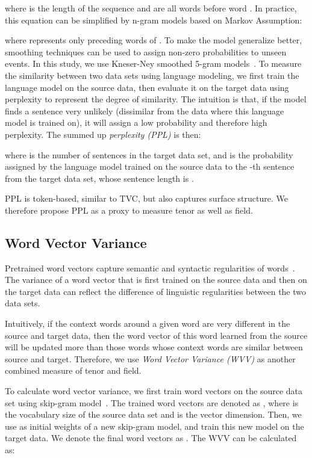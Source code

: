 \documentclass[11pt,a4paper]{article}
\begin{document}
where  is the length of the sequence and  are all words before word .
In practice, this equation can be simplified by n-gram models based on Markov Assumption:

where  represents only  preceding words of .
To make the model generalize better, smoothing techniques can be used to assign non-zero probabilities to unseen events. 
In this study, we use Kneser-Ney smoothed 5-gram models~\citep{Heafield:SMT:2011}. 
To measure the similarity between two data sets using language modeling, we first train the language model on the source data, then evaluate it on the target data using perplexity to represent the degree of similarity. 
The intuition is that, if the model finds a sentence very unlikely (dissimilar from the data where this language model is trained on), it will assign a low probability and therefore high perplexity. 
The summed up \emph{perplexity (PPL)} is then:

where  is the number of sentences in the target data set, and  is the probability assigned by the language model trained on the source data to the -th sentence from the target data set, whose sentence length is .

PPL is token-based, similar to TVC, but also captures surface structure. 
We therefore propose PPL as a proxy to measure tenor as well as field.

\subsection{Word Vector Variance}
Pretrained word vectors capture semantic and syntactic regularities of words~\citep{Artetxe:Labaka:CONLL:2018}. 
The variance of a word vector that is first trained on the source data and then on the target data can reflect the difference of linguistic regularities between the two data sets. 

Intuitively, if the context words around a given word are very different in the source and target data, then the word vector of this word learned from the source will be updated more than those words whose context words are similar between source and target. 
Therefore, we use \emph{Word Vector Variance (WVV)} as another combined measure of tenor and field.
 
To calculate word vector variance, we first train word vectors on the source data set using skip-gram model~\citep{Mikolov:Chen:arXiv:2013}. 
The trained word vectors are denoted as , where  is the vocabulary size of the source data set and  is the vector dimension. 
Then, we use  as initial weights of a new skip-gram model, and train this new model on the target data. 
We denote the final word vectors as . 
The WVV can be calculated as:
\end{document}
